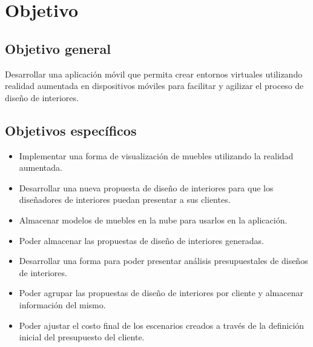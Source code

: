 \section{Objetivo}
\subsection{Objetivo general}
Desarrollar una aplicación móvil que permita crear entornos virtuales utilizando realidad aumentada en dispositivos móviles para facilitar y agilizar el proceso de diseño de interiores.

\subsection{Objetivos específicos}
\begin{itemize}
	\item Implementar una forma de visualización de muebles utilizando la realidad aumentada.
	\item Desarrollar una nueva propuesta de diseño de interiores para que los diseñadores de interiores puedan presentar a sus clientes.
	\item Almacenar modelos de muebles en la nube para usarlos en la aplicación.
	\item Poder almacenar las propuestas de diseño de interiores generadas.
	\item Desarrollar una forma para poder presentar análisis presupuestales de diseños de interiores.
	\item Poder agrupar las propuestas de diseño de interiores por cliente y almacenar información del mismo.
	\item Poder ajustar el costo final de los escenarios creados a través de la definición inicial del presupuesto del cliente.
\end{itemize}